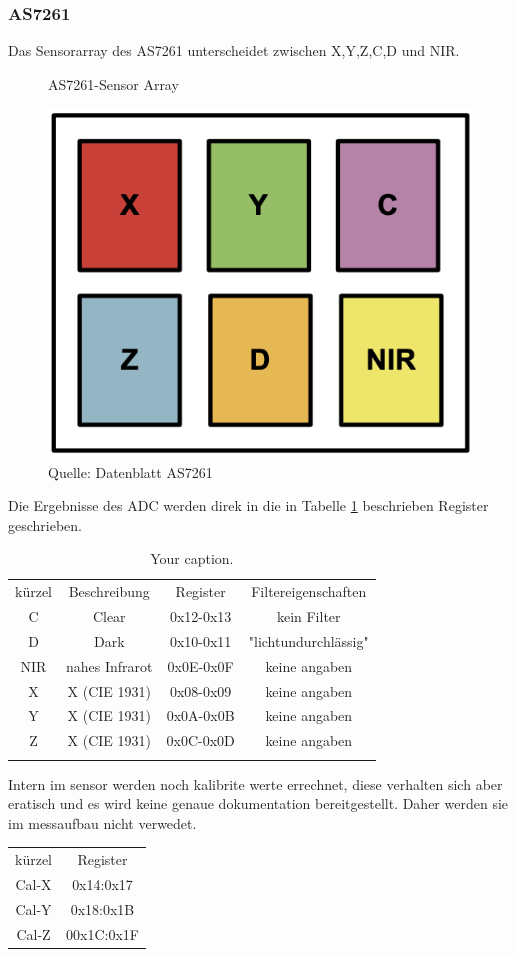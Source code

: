 \subsubsection{AS7261}\label{AS7261}
Das Sensorarray des AS7261 unterscheidet zwischen X,Y,Z,C,D und NIR.
\begin{figure}[H]
  \centering
    \caption{AS7261-Sensor Array}
 \includegraphics[width=0.4\linewidth]{img/AS7261-Sensor_Array.png}
  \caption*{Quelle: Datenblatt AS7261}
  \label{fig:AS7261-Sensor_Array}
\end{figure}

\noindent Die Ergebnisse des ADC werden direk in die in Tabelle \ref{RAW_Values_AS7261} beschrieben Register geschrieben.


\begin{table}[!ht]
\caption{Your caption.}
\centering
\begin{tabular}{ c c c c}
 kürzel & Beschreibung & Register & Filtereigenschaften\\
 C & Clear &0x12-0x13& kein Filter \\ 
 D & Dark &0x10-0x11& "lichtundurchlässig" \\  
 NIR & nahes Infrarot &0x0E-0x0F & keine angaben \\  
 X & X (CIE 1931) & 0x08-0x09 & keine angaben\\
 Y & X (CIE 1931) & 0x0A-0x0B & keine angaben\\  
 Z & X (CIE 1931) & 0x0C-0x0D & keine angaben\\
\label{RAW_Values_AS7261}
\end{tabular}
\end{table}

Intern im sensor werden noch kalibrite werte errechnet, diese verhalten sich aber eratisch und es wird keine genaue dokumentation bereitgestellt.
Daher werden sie im messaufbau nicht verwedet.

\begin{center}
\begin{tabular}{c c}
 kürzel & Register \\
 Cal-X & 0x14:0x17 \\ 
 Cal-Y & 0x18:0x1B \\  
 Cal-Z & 00x1C:0x1F \\  
\end{tabular}
\end{center}


